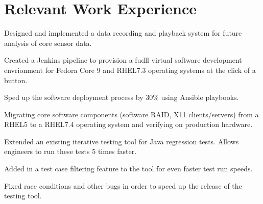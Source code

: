 \documentclass[letterpaper]{deedy-resume} %
\begin{document}
\begin{minipage}[t]{0.66\textwidth} %


\section{Relevant Work Experience}


\vspace{\topsep} %

\begin{tightitemize}
\item Designed and implemented a data recording and playback system for future analysis of core sensor data.
\item Created a Jenkins pipeline to provision a fudll virtual software development envrionment for Fedora Core 9 and RHEL7.3 operating systems at the click of a button.
\item Sped up the software deployment process by 30\% using Ansible playbooks.
\item Migrating core software components (software RAID, X11 clients/servers) from a RHEL5 to a RHEL7.4 operating system and verifying on production hardware.
\end{tightitemize}

\sectionspace %




\begin{tightitemize}
\item Extended an existing iterative testing tool for Java regression tests. Allows engineers to run these tests 5 times faster.
\item Added in a test case filtering feature to the tool for even faster test run speeds.
\item Fixed race conditions and other bugs in order to speed up the release of the testing tool.
\end{tightitemize}


\end{minipage}
\end{document}

